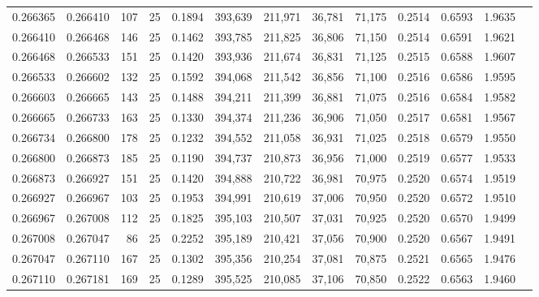 \begin{tabular}{rrrrrrrrrrrrr}
0.266365 & 0.266410 &   107 &  25 &                                     0.1894 & 393,639 & 211,971 &  36,781 &  71,175 & 0.2514 & 0.6593 & 1.9635 \\
0.266410 & 0.266468 &   146 &  25 &                                     0.1462 & 393,785 & 211,825 &  36,806 &  71,150 & 0.2514 & 0.6591 & 1.9621 \\
0.266468 & 0.266533 &   151 &  25 &                                     0.1420 & 393,936 & 211,674 &  36,831 &  71,125 & 0.2515 & 0.6588 & 1.9607 \\
0.266533 & 0.266602 &   132 &  25 &                                     0.1592 & 394,068 & 211,542 &  36,856 &  71,100 & 0.2516 & 0.6586 & 1.9595 \\
0.266603 & 0.266665 &   143 &  25 &                                     0.1488 & 394,211 & 211,399 &  36,881 &  71,075 & 0.2516 & 0.6584 & 1.9582 \\
0.266665 & 0.266733 &   163 &  25 &                                     0.1330 & 394,374 & 211,236 &  36,906 &  71,050 & 0.2517 & 0.6581 & 1.9567 \\
0.266734 & 0.266800 &   178 &  25 &                                     0.1232 & 394,552 & 211,058 &  36,931 &  71,025 & 0.2518 & 0.6579 & 1.9550 \\
0.266800 & 0.266873 &   185 &  25 &                                     0.1190 & 394,737 & 210,873 &  36,956 &  71,000 & 0.2519 & 0.6577 & 1.9533 \\
0.266873 & 0.266927 &   151 &  25 &                                     0.1420 & 394,888 & 210,722 &  36,981 &  70,975 & 0.2520 & 0.6574 & 1.9519 \\
0.266927 & 0.266967 &   103 &  25 &                                     0.1953 & 394,991 & 210,619 &  37,006 &  70,950 & 0.2520 & 0.6572 & 1.9510 \\
0.266967 & 0.267008 &   112 &  25 &                                     0.1825 & 395,103 & 210,507 &  37,031 &  70,925 & 0.2520 & 0.6570 & 1.9499 \\
0.267008 & 0.267047 &    86 &  25 &                                     0.2252 & 395,189 & 210,421 &  37,056 &  70,900 & 0.2520 & 0.6567 & 1.9491 \\
0.267047 & 0.267110 &   167 &  25 &                                     0.1302 & 395,356 & 210,254 &  37,081 &  70,875 & 0.2521 & 0.6565 & 1.9476 \\
0.267110 & 0.267181 &   169 &  25 &                                     0.1289 & 395,525 & 210,085 &  37,106 &  70,850 & 0.2522 & 0.6563 & 1.9460 \\

\end{tabular}
